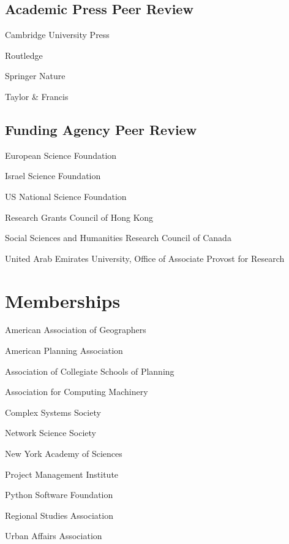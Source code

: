 \documentclass[11pt,a4paper]{report} %
\newcommand{\listitemspace}{0.25em}
\renewenvironment{itemize}
{
  \begin{list}{}{\setlength{\leftmargin}{0em}
      \setlength{\parskip}{0em}
      \setlength{\itemsep}{\listitemspace}
  \setlength{\parsep}{\listitemspace}}}
  {
\end{list}}
\begin{document}
\subsection*{Academic Press Peer Review}

\begin{itemize}

  \item Cambridge University Press
  \item Routledge
  \item Springer Nature
  \item Taylor \& Francis

\end{itemize}

\subsection*{Funding Agency Peer Review}

\begin{itemize}

  \item European Science Foundation
  \item Israel Science Foundation
  \item US National Science Foundation
  \item Research Grants Council of Hong Kong
  \item Social Sciences and Humanities Research Council of Canada
  \item United Arab Emirates University, Office of Associate Provost for Research

\end{itemize}

\section*{Memberships}

\begin{itemize}

  \item American Association of Geographers
  \item American Planning Association
  \item Association of Collegiate Schools of Planning
  \item Association for Computing Machinery
  \item Complex Systems Society
  \item Network Science Society
  \item New York Academy of Sciences
  \item Project Management Institute
  \item Python Software Foundation
  \item Regional Studies Association
  \item Urban Affairs Association

\end{itemize}
\end{document}
